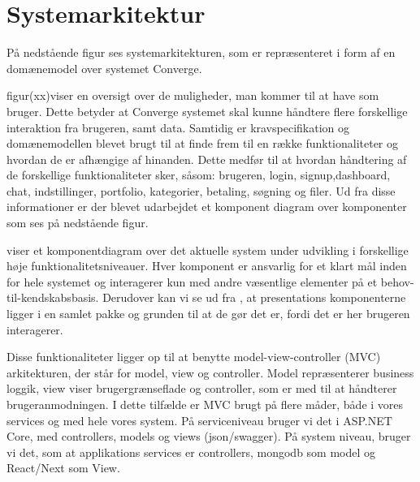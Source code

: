 
\section{Systemarkitektur}
På nedstående figur ses systemarkitekturen, som er repræsenteret i form af en domænemodel over systemet Converge.


figur(xx)viser en oversigt over de muligheder, man kommer til at have som bruger. Dette betyder at Converge systemet
skal kunne håndtere flere forskellige interaktion fra brugeren, samt data. Samtidig er kravspecifikation og domænemodellen
blevet brugt til at finde frem til en række funktionaliteter og hvordan de er afhængige af hinanden. Dette
medfør til at hvordan håndtering af de forskellige funktionaliteter sker, såsom: brugeren, login, signup,dashboard,
chat, indstillinger, portfolio, kategorier, betaling, søgning og filer. Ud fra disse informationer er der blevet udarbejdet
et komponent diagram over komponenter som ses på nedstående figur.


 viser et komponentdiagram over det aktuelle system under udvikling i forskellige høje funktionalitetsniveauer.
Hver komponent er ansvarlig for et klart mål inden for hele systemet og interagerer kun med andre væsentlige
elementer på et behov-til-kendskabsbasis. Derudover kan vi se ud fra , at presentations komponenterne
ligger i en samlet pakke og grunden til at de gør det er, fordi det er her brugeren interagerer.

Disse funktionaliteter ligger op til at benytte model-view-controller (MVC) arkitekturen, der står for model, view og
controller. Model repræsenterer business loggik, view viser brugergrænseflade og controller, som er med til at håndterer
brugeranmodningen. I dette tilfælde er MVC brugt på flere måder, både i vores services og med hele vores
system. På serviceniveau bruger vi det i ASP.NET Core, med controllers, models og views (json/swagger). På system
niveau, bruger vi det, som at applikations services er controllers, mongodb som model og React/Next som
View.




